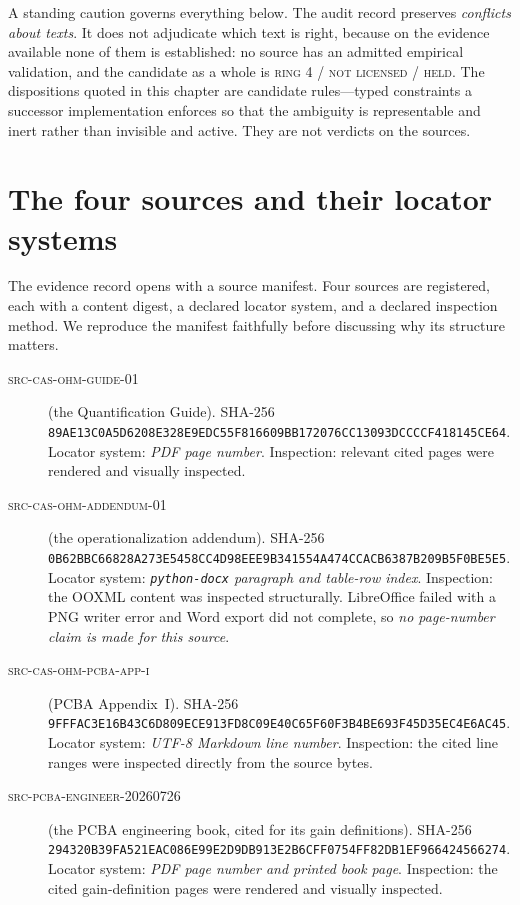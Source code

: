 A standing caution governs everything below. The audit record preserves
\emph{conflicts about texts}. It does not adjudicate which text is right,
because on the evidence available none of them is established: no source has
an admitted empirical validation, and the candidate as a whole is
\textsc{ring 4 / not licensed / held}. The dispositions quoted in this
chapter are candidate rules---typed constraints a successor implementation
enforces so that the ambiguity is representable and inert rather than
invisible and active. They are not verdicts on the sources.

\section{The four sources and their locator systems}\label{ch04:sources}

The evidence record opens with a source manifest. Four sources are
registered, each with a content digest, a declared locator system, and a
declared inspection method. We reproduce the manifest faithfully before
discussing why its structure matters.

\begin{description}
\item[\textsc{src-cas-ohm-guide-01}] (the Quantification Guide). SHA-256
\texttt{89AE13C0A5D6208E328E9EDC55F816609BB172076CC13093DCCCCF418145CE64}.
Locator system: \emph{PDF page number}. Inspection: relevant cited pages were
rendered and visually inspected.
\item[\textsc{src-cas-ohm-addendum-01}] (the operationalization addendum).
SHA-256
\texttt{0B62BBC66828A273E5458CC4D98EEE9B341554A474CCACB6387B209B5F0BE5E5}.
Locator system: \emph{\texttt{python-docx} paragraph and table-row index}.
Inspection: the OOXML content was inspected structurally. LibreOffice failed
with a PNG writer error and Word export did not complete, so \emph{no
page-number claim is made for this source}.
\item[\textsc{src-cas-ohm-pcba-app-i}] (PCBA Appendix~I). SHA-256
\texttt{9FFFAC3E16B43C6D809ECE913FD8C09E40C65F60F3B4BE693F45D35EC4E6AC45}.
Locator system: \emph{UTF-8 Markdown line number}. Inspection: the cited line
ranges were inspected directly from the source bytes.
\item[\textsc{src-pcba-engineer-20260726}] (the PCBA engineering book, cited
for its gain definitions). SHA-256
\texttt{294320B39FA521EAC086E99E2D9DB913E2B6CFF0754FF82DB1EF966424566274}.
Locator system: \emph{PDF page number and printed book page}. Inspection: the
cited gain-definition pages were rendered and visually inspected.
\end{description}

